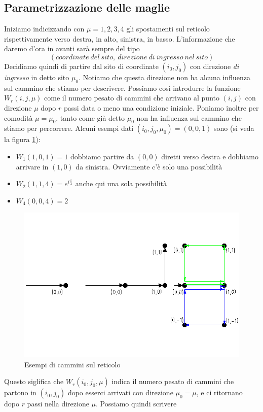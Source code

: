\documentclass[11pt]{article}
\begin{document}
\subsection{Parametrizzazione delle maglie}
Iniziamo indicizzando con $\mu=1,2,3,4$ gli spostamenti sul reticolo rispettivamente verso destra, in alto, sinistra, in basso.
L'informazione che daremo d'ora in avanti sarà sempre del tipo
$$ (coordinate \ del \ sito, \ direzione \ di \ ingresso \ nel \ sito)
$$
Decidiamo quindi di partire dal sito di coordinate $(i_0,j_0)$ con direzione \emph{di ingresso} in detto sito $\mu_0$. Notiamo che questa direzione non ha alcuna influenza sul cammino che stiamo per descrivere. Possiamo così introdurre la funzione $W_r(i,j,\mu)$ come il numero pesato di cammini che arrivano al punto $(i,j)$ con direzione $\mu$ dopo $r$ passi data o meno una condizione iniziale. Poniamo inoltre per comodità $\mu=\mu_0$, tanto come già detto $\mu_0$ non ha influenza sul cammino che stiamo per percorrere. Alcuni esempi dati $(i_0,j_0,\mu_0)=(0,0,1)$ sono (si veda la figura \ref{v6}):
\begin{itemize}
\item{$W_1(1,0,1)=1$ dobbiamo partire da $(0,0)$ diretti verso destra e dobbiamo arrivare in $(1,0)$ da sinistra. Ovviamente c'è solo una possibilità}
\item{$W_2(1,1,4)=e^{i\frac{\pi}{4}}$ anche qui una sola possibilità}
\item{$W_4(0,0,4)=2$}
\end{itemize}
\begin{figure}[h]
\centering
\includegraphics[width=0.8\columnwidth]{v6}
\caption{Esempi di cammini sul reticolo}
\label{v6}
\end{figure}
 Questo siglifica che $W_r(i_0,j_0,\mu)$ indica il numero pesato di cammini che partono in $(i_0,j_0)$ dopo esserci arrivati con direzione $\mu_0=\mu$, e ci ritornano dopo $r$ passi nella direzione $\mu$. Possiamo quindi scrivere
\end{document}
